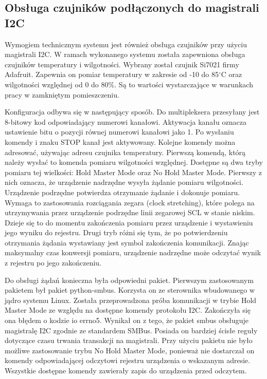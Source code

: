 \documentclass[a4paper,12pt,twoside]{article}
\begin{document}
\subsection{Obsługa czujników podłączonych do magistrali I2C}
Wymogiem technicznym systemu jest również obsługa czujników przy użyciu magistrali I2C. W ramach wykonanego systemu została zapewniona obsługa czujników temperatury i wilgotności. Wybrany został czujnik Si7021 firmy Adafruit. Zapewnia on pomiar temperatury w zakresie od -10 do 85$^\circ$C oraz wilgotności względnej od 0 do 80\%. Są to wartości wystarczające w warunkach pracy w zamkniętym pomieszczeniu.

Konfiguracja odbywa się w następujący sposób. Do multipleksera przesyłany jest 8-bitowy kod odpowiadający numerowi kanałowi. Aktywacja kanału oznacza ustawienie bitu o pozycji równej numerowi kanałowi jako 1. Po wysłaniu komendy i znaku STOP kanał jest aktywowany. Kolejne komendy można adresować, używając adresu czujnika temperatury. Pierwszą komendą, którą należy wysłać to komenda pomiaru wilgotności względnej. Dostępne są dwa tryby pomiaru tej wielkości: Hold Master Mode oraz No Hold Master Mode. Pierwszy z nich oznacza, że urządzenie nadrzędne wysyła żądanie pomiaru wilgotności. Urządzenie podrzędne potwierdza otrzymanie żądanie i dokonuje pomiaru. Wymaga to zastosowania rozciągania zegara (clock stretching), które polega na utrzymywania przez urządzenie podrzędne linii zegarowej SCL w stanie niskim. Dzieje się to do momentu zakończenia pomiaru przez urządzenie i wystawieniu jego wyniku do rejestru. Drugi tryb różni się tym, że po potwierdzeniu otrzymania żądania wystawiany jest symbol zakończenia komunikacji. Znając maksymalny czas konwersji pomiaru, urządzenie nadrzędne może odczytać wynik z rejestru po jego zakończeniu. 

Do obsługi żądań konieczna była odpowiedni pakiet. Pierwszym zastosowanym pakietem był pakiet python-smbus. Korzysta on ze sterownika wbudowanego w jądro systemu Linux. Została przeprowadzona próba komunikacji w trybie Hold Master Mode ze względu na dostępne komendy protokołu I2C. Zakończyła się ona błędem o kodzie io errno5. Wynikał on z tego, że pakiet smbus obsługuje magistralę I2C zgodnie ze standardem SMBus. Posiada on bardziej ścisłe reguły dotyczące czasu trwania transakcji na magistrali. Przy użyciu pakietu nie było możliwe zastosowanie trybu No Hold Master Mode, ponieważ nie dostarczał on komendy odpowiadającej odczytowi rejestru urządzenia o wskazanym adresie. Wszystkie dostępne komendy zawierały zapis do urządzenia przed odczytem.
\end{document}
